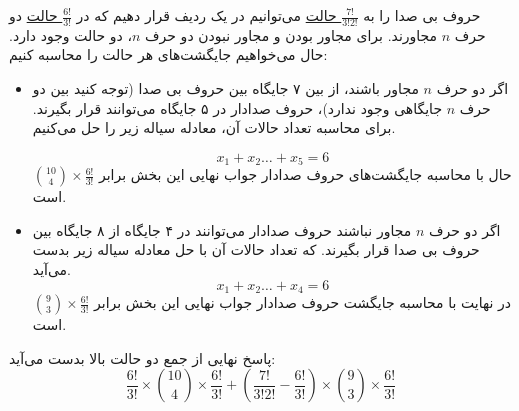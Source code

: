 \p
حروف بی صدا را به 
\underline{$\frac{7!}{3!2!}$ حالت}
 می‌توانیم در یک ردیف قرار دهیم که در 
 \underline{$\frac{6!}{3!}$ حالت}
دو حرف $n$ مجاورند.
  برای مجاور بودن و مجاور نبودن دو حرف 
$n$،
دو حالت وجود دارد. حال می‌خواهیم جایگشت‌های هر حالت را محاسبه ‌کنیم:
\begin{itemize}
\item 
اگر دو حرف $n$ مجاور باشند، 
از بین ۷ جایگاه بین حروف بی صدا (توجه کنید بین دو حرف $n$ جایگاهی وجود ندارد)، حروف صدادار در ۵ جایگاه می‌توانند قرار بگیرند.
 برای محاسبه تعداد حالات آن، معادله سیاله زیر را حل می‌کنیم.

$$x_1 + x_2 \ldots + x_5 = 6$$
حال با محاسبه جایگشت‌های حروف صدادار جواب نهایی این بخش برابر
\underline{$\binom{10}{4}\times\frac{6!}{3!}$}
است.
\item 
اگر دو حرف $n$ مجاور نباشند حروف صدادار می‌توانند در ۴ جایگاه از ۸ جایگاه بین حروف بی صدا قرار بگیرند. که تعداد حالات آن با حل معادله سیاله زیر بدست می‌آید.
$$x_1 + x_2 \ldots + x_4 = 6$$
در نهایت با محاسبه جایگشت حروف صدادار جواب نهایی این بخش برابر
\underline{$\binom{9}{3}\times\frac{6!}{3!}$}
است.
\end{itemize}
پاسخ نهایی از جمع دو حالت بالا بدست می‌آید:
$$\frac{6!}{3!}\times\binom{10}{4}\times\frac{6!}{3!}+ (\frac{7!}{3!2!} - \frac{6!}{3!})\times\binom{9}{3}\times\frac{6!}{3!}$$
